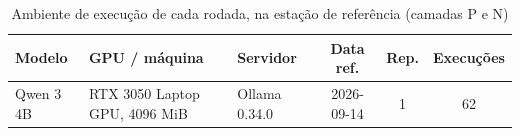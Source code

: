 \begin{table}[htbp!]
\centering
\caption{Ambiente de execução de cada rodada, na estação de referência (camadas P e N)}
\label{tab:ambiente_estacao}
\small
\begin{tabular}{|l|l|l|c|c|c|}
\hline
\textbf{Modelo} & \textbf{GPU / máquina} & \textbf{Servidor} & \textbf{Data ref.} & \textbf{Rep.} & \textbf{Execuções} \\
\hline
Qwen 3 4B & RTX 3050 Laptop GPU, 4096 MiB & Ollama 0.34.0 & 2026-09-14 & 1 & 62 \\
\hline
\end{tabular}
\end{table}
